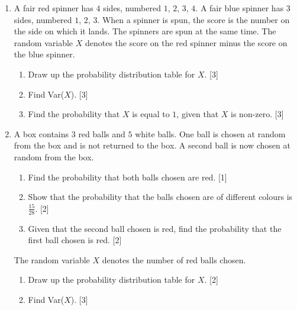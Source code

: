 \begin{enumerate}
	\begin{enumerate}[label=(\roman*)]
		\item Draw a fully labelled tree diagram to illustrate this situation. \hfill [3]
		\item Draw up the probability distribution table for the number of toffees taken. \hfill [3]
		\item Find the mean number of toffees taken. \hfill[1]
		\item Find the probability that the first sweet taken is a chocolate, given that the second sweet taken is a toffee. \hfill [4]
	\end{enumerate}
	



\item  A fair red spinner has $4$ sides, numbered $1$, $2$, $3$, $4$. A fair blue spinner has $3$ sides, numbered $1$, $2$, $3$.
When a spinner is spun, the score is the number on the side on which it lands. The spinners are spun
at the same time. The random variable $X$ denotes the score on the red spinner minus the score on the blue spinner.

\begin{enumerate}[label=(\roman*)]
	\item Draw up the probability distribution table for $X$. \hfill [3]
	\item Find Var($X$). \hfill[3]
	\item Find the probability that $X$ is equal to $1$, given that $X$ is non-zero. \hfill[3]
\end{enumerate}

\item A box contains $3$ red balls and $5$ white balls. One ball is chosen at random from the box and is not returned to the box. A second ball is now chosen at random from the box.

\begin{enumerate}[label=(\roman*)]
	\item Find the probability that both balls chosen are red. \hfill [1]
	\item Show that the probability that the balls chosen are of different colours is $\frac{15}{28}$. \hfill [2]
	\item Given that the second ball chosen is red, find the probability that the first ball chosen is red. \hfill[2]
\end{enumerate}

The random variable $X$ denotes the number of red balls chosen.

\begin{enumerate}[resume,label=(\roman*)]
	\item Draw up the probability distribution table for $X$. \hfill[2]
	\item Find Var($X$). \hfill [3]
\end{enumerate}


	
\end{enumerate}
